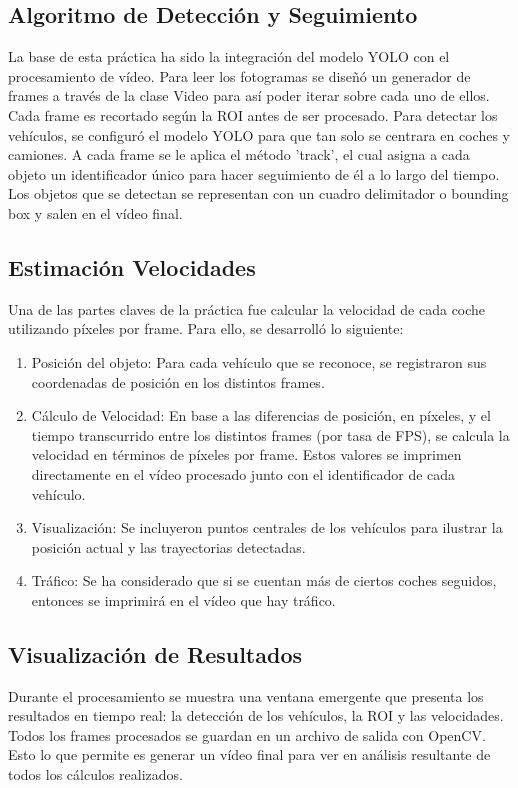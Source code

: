 \subsection{Algoritmo de Detección y Seguimiento}
La base de esta práctica ha sido la integración del modelo YOLO con el procesamiento de vídeo. 
Para leer los fotogramas se diseñó un generador de frames a través de la clase Video para así poder iterar sobre cada uno de ellos.  Cada frame es recortado según la ROI antes de ser procesado.
Para detectar los vehículos, se configuró el modelo YOLO para que tan solo se centrara en coches y camiones.  A cada frame se le aplica el método 'track', el cual asigna a cada objeto un identificador único para hacer seguimiento de él a lo largo del tiempo.
Los objetos que se detectan se representan con un cuadro delimitador o bounding box y salen en el vídeo final.


\subsection{Estimación Velocidades}
Una de las partes claves de la práctica fue calcular la velocidad de cada coche utilizando píxeles por frame.  Para ello, se desarrolló lo siguiente:
\begin{enumerate}
    \item Posición del objeto:
    Para cada vehículo que se reconoce, se registraron sus coordenadas de posición en los distintos frames.
    \item Cálculo de Velocidad:
    En base a las diferencias de posición, en píxeles, y el tiempo transcurrido entre los distintos frames (por tasa de FPS), se calcula la velocidad en términos de píxeles por frame.
    Estos valores se imprimen directamente en el vídeo procesado junto con el identificador de cada vehículo.
    \item Visualización:
    Se incluyeron puntos centrales de los vehículos para ilustrar la posición actual y las trayectorias detectadas.
    \item Tráfico:
    Se ha considerado que si se cuentan más de ciertos coches seguidos, entonces se imprimirá en el vídeo que hay tráfico.
\end{enumerate}

\subsection{Visualización de Resultados}
Durante el procesamiento se muestra una ventana emergente que presenta los resultados en tiempo real: la detección de los vehículos, la ROI y las velocidades. Todos los frames procesados se guardan en un archivo de 
salida con OpenCV.  Esto lo que permite es generar un vídeo final para ver en análisis 
resultante de todos los cálculos realizados.


